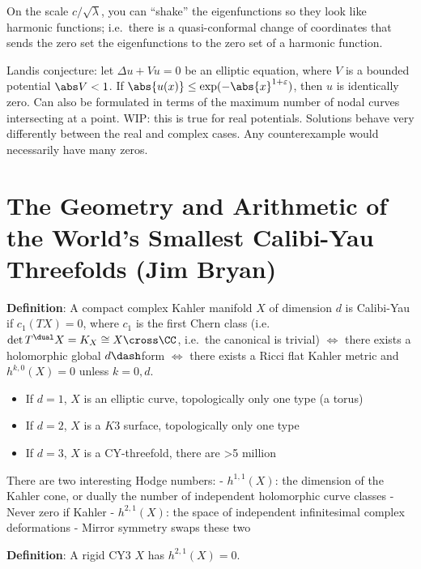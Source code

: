 On the scale \(c/\sqrt \lambda\), you can ``shake'' the eigenfunctions
so they look like harmonic functions; i.e.~there is a quasi-conformal
change of coordinates that sends the zero set the eigenfunctions to the
zero set of a harmonic function.

Landis conjecture: let \(\Delta u + Vu = 0\) be an elliptic equation,
where \(V\) is a bounded potential \(\abs V < 1\). If
\(\abs {u(x)} \leq\exp(-\abs{x}^{1+\varepsilon})\), then \(u\) is
identically zero. Can also be formulated in terms of the maximum number
of nodal curves intersecting at a point. WIP: this is true for real
potentials. Solutions behave very differently between the real and
complex cases. Any counterexample would necessarily have many zeros.

\hypertarget{the-geometry-and-arithmetic-of-the-worlds-smallest-calibi-yau-threefolds-jim-bryan}{%
\section{The Geometry and Arithmetic of the World's Smallest Calibi-Yau
Threefolds (Jim
Bryan)}\label{the-geometry-and-arithmetic-of-the-worlds-smallest-calibi-yau-threefolds-jim-bryan}}

\textbf{Definition}: A compact complex Kahler manifold \(X\) of
dimension \(d\) is Calibi-Yau if \(c_1(TX)=0\), where \(c_1\) is the
first Chern class (i.e.~\(\det T^\dual X = K_X \cong X\cross\CC\),
i.e.~the canonical is trivial) \(\iff\) there exists a holomorphic
global \(d\dash\)form \(\iff\) there exists a Ricci flat Kahler metric
and \(h^{k, 0}(X) = 0\) unless \(k=0,d\).

\begin{itemize}
\tightlist
\item
  If \(d=1\), \(X\) is an elliptic curve, topologically only one type (a
  torus)
\item
  If \(d=2\), \(X\) is a \(K3\) surface, topologically only one type
\item
  If \(d=3\), \(X\) is a CY-threefold, there are \textgreater5 million
\end{itemize}

There are two interesting Hodge numbers: - \(h^{1,1}(X)\): the dimension
of the Kahler cone, or dually the number of independent holomorphic
curve classes - Never zero if Kahler - \(h^{2,1}(X)\): the space of
independent infinitesimal complex deformations - Mirror symmetry swaps
these two

\textbf{Definition}: A rigid CY3 \(X\) has \(h^{2,1}(X)=0\).

